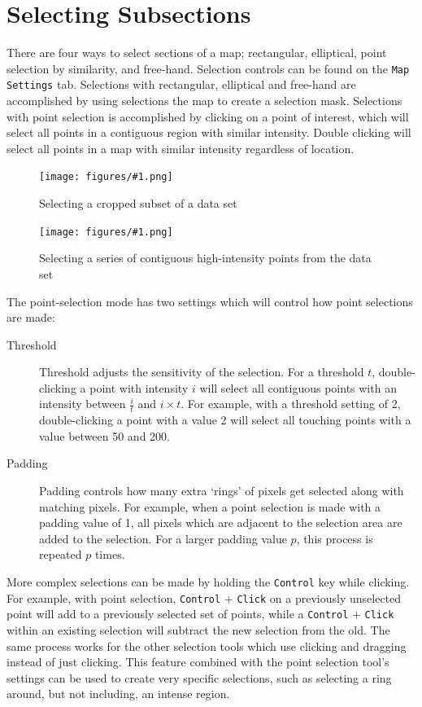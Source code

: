 \documentclass[article,twoside,11pt]{report}
\newcommand{\command}[1]{\texttt{#1}}
\newcommand{\screenshot}[2]{%
\begin{figure}[h!]
\centering\texttt{[image: figures/\#1.png]}
\caption{#2}
\end{figure}
}
\newcommand{\tocsection}[1]{\section*{#1}\addcontentsline{toc}{section}{#1}}
\begin{document}
\tocsection{Selecting Subsections}

There are four ways to select sections of a map; rectangular, elliptical, point selection by similarity, and free-hand. Selection controls can be found on the \command{Map Settings} tab. Selections with rectangular, elliptical and free-hand are accomplished by using selections the map to create a selection mask. Selections with point selection is accomplished by clicking on a point of interest, which will select all points in a contiguous region with similar intensity. Double clicking will select all points in a map with similar intensity regardless of location. 

\screenshot{select-subset}{Selecting a cropped subset of a data set}
\screenshot{select-points}{Selecting a series of contiguous high-intensity points from the data set}

The point-selection mode has two settings which will control how point selections are made: 

\begin{description}

\item [Threshold] Threshold adjusts the sensitivity of the selection. For a threshold $t$, double-clicking a point with intensity $i$ will select all contiguous points with an intensity between $\frac{i}{t}$ and $i\times t$. For example, with a threshold setting of 2, double-clicking a point with a value 2 will select all touching points with a value between 50 and 200.

\item [Padding] Padding controls how many extra `rings' of pixels get selected along with matching pixels. For example, when a point selection is made with a padding value of 1, all pixels which are adjacent to the selection area are added to the selection. For a larger padding value $p$, this process is repeated $p$ times.

\end{description}

More complex selections can be made by holding the \command{Control} key while clicking. For example, with point selection, \command{Control} + \command{Click} on a previously unselected point will add to a previously selected set of points, while a \command{Control} + \command{Click} within an existing selection will subtract the new selection from the old. The same process works for the other selection tools which use clicking and dragging instead of just clicking. This feature combined with the point selection tool's settings can be used to create very specific selections, such as selecting a ring around, but not including, an intense region.
\end{document}
